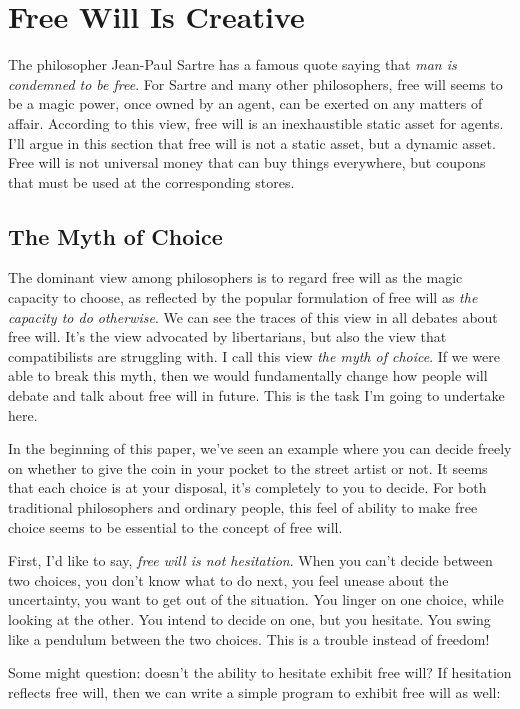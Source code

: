 \section{Free Will Is Creative}

The philosopher Jean-Paul Sartre has a famous quote saying that \emph{man is condemned to be free}. For Sartre and many other philosophers, free will seems to be a magic power, once owned by an agent, can be exerted on any matters of affair. According to this view, free will is an inexhaustible static asset for agents. I'll argue in this section that free will is not a static asset, but a dynamic asset. Free will is not universal money that can buy things everywhere, but coupons that must be used at the corresponding stores.

\subsection{The Myth of Choice}

The dominant view among philosophers is to regard free will as the magic capacity to choose, as reflected by the popular formulation of free will as \emph{the capacity to do otherwise}. We can see the traces of this view in all debates about free will. It's the view advocated by libertarians, but also the view that compatibilists are struggling with. I call this view \emph{the myth of choice}. If we were able to break this myth, then we would fundamentally change how people will debate and talk about free will in future. This is the task I'm going to undertake here.

In the beginning of this paper, we've seen an example where you can decide freely on whether to give the coin in your pocket to the street artist or not. It seems that each choice is at your disposal, it's completely to you to decide. For both traditional philosophers and ordinary people, this feel of ability to make free choice seems to be essential to the concept of free will.

First, I'd like to say, \emph{free will is not hesitation}. When you can't decide between two choices, you don't know what to do next, you feel unease about the uncertainty, you want to get out of the situation. You linger on one choice, while looking at the other. You intend to decide on one, but you hesitate. You swing like a pendulum between the two choices. This is a trouble instead of freedom!

Some might question: doesn't the ability to hesitate exhibit free will? If hesitation reflects free will, then we can write a simple program to exhibit free will as well:

